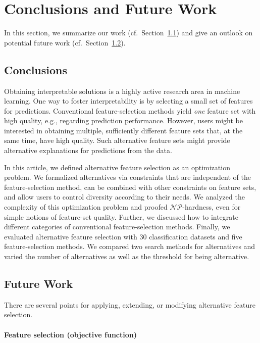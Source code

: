 \documentclass{article}
\theoremstyle{definition}
\begin{document}
\section{Conclusions and Future Work}
\label{sec:afs:conclusion}

In this section, we summarize our work (cf.~Section~\ref{sec:afs:conclusion:conclusion}) and give an outlook on potential future work (cf.~Section~\ref{sec:afs:conclusion:future-work}).

\subsection{Conclusions}
\label{sec:afs:conclusion:conclusion}

Obtaining interpretable solutions is a highly active research area in machine learning.
One way to foster interpretability is by selecting a small set of features for predictions.
Conventional feature-selection methods yield \emph{one} feature set with high quality, e.g., regarding prediction performance.
However, users might be interested in obtaining multiple, sufficiently different feature sets that, at the same time, have high quality.
Such alternative feature sets might provide alternative explanations for predictions from the data.

In this article, we defined alternative feature selection as an optimization problem.
We formalized alternatives via constraints that are independent of the feature-selection method, can be combined with other constraints on feature sets, and allow users to control diversity according to their needs.
We analyzed the complexity of this optimization problem and proofed $\mathcal{NP}$-hardness, even for simple notions of feature-set quality.
Further, we discussed how to integrate different categories of conventional feature-selection methods.
Finally, we evaluated alternative feature selection with 30 classification datasets and five feature-selection methods.
We compared two search methods for alternatives and varied the number of alternatives as well as the threshold for being alternative.

\subsection{Future Work}
\label{sec:afs:conclusion:future-work}

There are several points for applying, extending, or modifying alternative feature selection.

\paragraph{Feature selection (objective function)}
\end{document}
